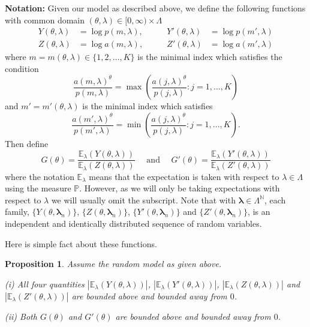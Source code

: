 \documentclass{amsart}
\newtheorem{proposition}[theorem]{Proposition}
\theoremstyle{plain}
\numberwithin{equation}{section}
\newcommand{\N}{{\mathbb N}}
\renewcommand{\P}{{\mathbb P}}
\newcommand{\blambda}{{\boldsymbol{\lambda}}}
\newcommand{\ee}{{\mathbb E}}
\begin{document}
\textbf{Notation:} Given our model as described above, we define the following functions with common 
domain $(\theta,\lambda) \in [0,\infty) \times \Lambda$
\begin{align*}
   Y(\theta ,\lambda) &=\log p(m,\lambda), & \qquad Y'(\theta ,\lambda) &=\log p(m',\lambda) \\
    Z(\theta ,\lambda) &=\log a(m,\lambda),& \qquad Z'(\theta ,\lambda)  &=\log a(m',\lambda)
\end{align*}%
where $m=m(\theta ,\lambda) \in \{1,2,\ldots, K \}$ is the minimal index which satisfies the condition 
\begin{equation}  \label{eq:m_definition}
   \frac{a(m,\lambda)^{\theta}}{p(m,\lambda)}=
         \max \left( \frac{a(j,\lambda)^{\theta}}{p(j,\lambda)}:j=1,...,K\right) 
\end{equation}
and $m'=m'(\theta ,\lambda)$ is the minimal index which satisfies 
\begin{equation} \label{eq:mprime_definition}
   \frac{a(m',\lambda)^{\theta}}{p(m',\lambda)}=
   \min\left( \frac{a(j,\lambda)^{\theta}}{p(j,\lambda)}:j=1,...,K\right).
\end{equation}
Then define 
\begin{equation} \label{eq:G_definition}
    G(\theta)=\frac{\ee_\lambda(Y(\theta ,\lambda))}{\ee_\lambda(Z(\theta ,\lambda))}
          \quad \text{ and } \quad
   G'(\theta)=
       \frac{\ee_\lambda(Y'(\theta ,\lambda))}{\ee_\lambda(Z'(\theta ,\lambda))}
\end{equation}
where the notation $\ee_\lambda$ means that the expectation is taken with respect to  $\lambda \in \Lambda$ using the measure $\P$. 
However, as we will only be taking expectations with respect to $\lambda$ we will usually omit the subscript.
Note that with $\blambda \in \Lambda^\N$, each family, $\{Y(\theta ,\blambda_n)\}$, 
$\{Z(\theta ,\blambda_n)\}$, $\{Y'(\theta ,\blambda_n)\}$ and $\{Z'(\theta ,\blambda_n)\}$, is an independent and identically distributed sequence of random variables.

Here is simple fact about these functions.

\begin{proposition}
\label{GBded}
Assume the random model as given above.

(i) All four quantities $\left| \ee_\lambda(Y(\theta,\lambda))\right| $, $\left| \ee_\lambda(Y'(\theta,\lambda))\right| $, $\left| \ee_\lambda(Z(\theta,\lambda))\right|$ and 
$\left| \ee_\lambda(Z'(\theta,\lambda))\right|$ are bounded above and bounded away from $0$.

(ii) Both $G(\theta)$ and $G'(\theta)$ are bounded above and bounded away from $0$.
\end{proposition}
\end{document}
